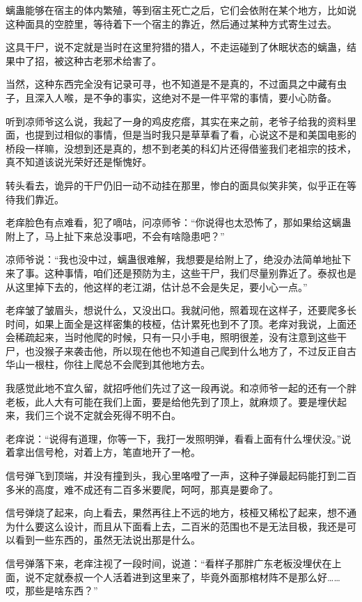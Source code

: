 螭蛊能够在宿主的体内繁殖，等到宿主死亡之后，它们会依附在某个地方，比如说这种面具的空腔里，等待着下一个宿主的靠近，然后通过某种方式寄生过去。

这具干尸，说不定就是当时在这里狩猎的猎人，不走运碰到了休眠状态的螭蛊，结果中了招，被这种古老邪术给害了。

当然，这种东西完全没有记录可寻，也不知道是不是真的，不过面具之中藏有虫子，且深入人喉，是不争的事实，这绝对不是一件平常的事情，要小心防备。

听到凉师爷这么说，我起了一身的鸡皮疙瘩，其实在来之前，老爷子给我的资料里面，也提到过相似的事情，但是当时我只是草草看了看，心说这不是和美国电影的桥段一样嘛，没想到还是真的，想不到老美的科幻片还得借鉴我们老祖宗的技术，真不知道该说光荣好还是惭愧好。

转头看去，诡异的干尸仍旧一动不动挂在那里，惨白的面具似笑非笑，似乎正在等待我们靠近。

老痒脸色有点难看，犯了嘀咕，问凉师爷：“你说得也太恐怖了，那如果给这螭蛊附上了，马上扯下来总没事吧，不会有啥隐患吧？”

凉师爷说：“我也没中过，螭蛊很难解，我想要是给附上了，绝没办法简单地扯下来了事。这种事情，咱们还是预防为主，这些干尸，我们尽量别靠近了。泰叔也是从这里掉下去的，他这样的老江湖，估计总不会是失足，要小心一点。”

老痒皱了皱眉头，想说什么，又没出口。我就问他，照着现在这样子，还要爬多长时间，如果上面全是这样密集的枝桠，估计累死也到不了顶。老痒对我说，上面还会稀疏起来，当时他爬的时候，只有一只小手电，照明很差，没有注意到这些干尸，也没猴子来袭击他，所以现在他也不知道自己爬到什么地方了，不过反正自古华山一根柱，你往上爬总不会爬到其他地方去。

我感觉此地不宜久留，就招呼他们先过了这一段再说。和凉师爷一起的还有一个胖老板，此人大有可能在我们上面，要是给他先到了顶上，就麻烦了。要是埋伏起来，我们三个说不定就会死得不明不白。

老痒说：“说得有道理，你等一下，我打一发照明弹，看看上面有什么埋伏没。”说着拿出信号枪，对着上方，笔直地开了一枪。

信号弹飞到顶端，并没有撞到头，我心里咯噔了一声，这种子弹最起码能打到二百多米的高度，难不成还有二百多米要爬，呵呵，那真是要命了。

信号弹烧了起来，向上看去，果然再往上不远的地方，枝桠又稀松了起来，想不通为什么要这么设计，而且从下面看上去，二百米的范围也不是无法目极，我还是可以看到一些东西的，虽然无法说出那是什么。

信号弹落下来，老痒注视了一段时间，说道：“看样子那胖广东老板没埋伏在上面，说不定就泰叔一个人活着进到这里来了，毕竟外面那棺材阵不是那么好……哎，那些是啥东西？”

